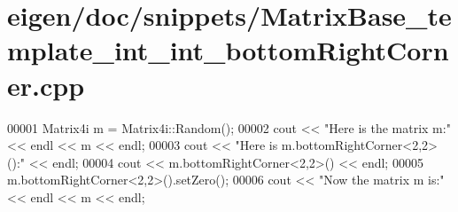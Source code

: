 \hypertarget{eigen_2doc_2snippets_2_matrix_base__template__int__int__bottom_right_corner_8cpp_source}{}\section{eigen/doc/snippets/\+Matrix\+Base\+\_\+template\+\_\+int\+\_\+int\+\_\+bottom\+Right\+Corner.cpp}
\label{eigen_2doc_2snippets_2_matrix_base__template__int__int__bottom_right_corner_8cpp_source}

\begin{DoxyCode}
00001 Matrix4i m = Matrix4i::Random();
00002 cout << \textcolor{stringliteral}{"Here is the matrix m:"} << endl << m << endl;
00003 cout << \textcolor{stringliteral}{"Here is m.bottomRightCorner<2,2>():"} << endl;
00004 cout << m.bottomRightCorner<2,2>() << endl;
00005 m.bottomRightCorner<2,2>().setZero();
00006 cout << \textcolor{stringliteral}{"Now the matrix m is:"} << endl << m << endl;
\end{DoxyCode}
